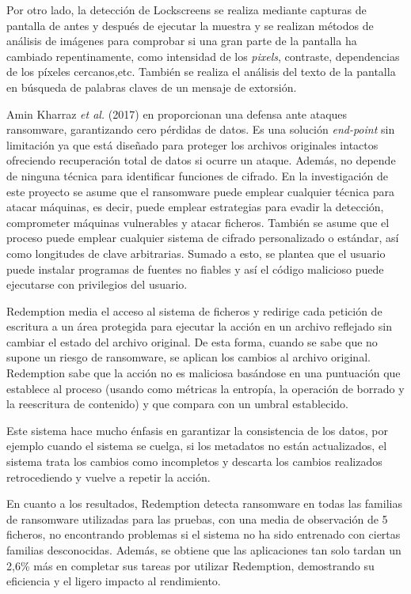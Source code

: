 Por otro lado, la detección de Lockscreens se realiza mediante capturas de pantalla de antes y después de ejecutar la muestra y se realizan métodos de análisis de imágenes para comprobar si una gran parte de la pantalla ha cambiado repentinamente, como intensidad de los \textit{pixels}, contraste, dependencias de los píxeles cercanos,etc. También se realiza el análisis del texto de la pantalla en búsqueda de palabras claves de un mensaje de extorsión.

Amin Kharraz \textit{et al.} (2017) en \cite{AminK2017} proporcionan una defensa ante ataques ransomware, garantizando cero pérdidas de datos. Es una solución \textit{end-point} sin limitación ya que está diseñado para proteger los archivos originales intactos ofreciendo recuperación total de datos si ocurre un ataque. Además, no depende de ninguna técnica para identificar funciones de cifrado.
En la investigación de este proyecto se asume que el ransomware puede emplear cualquier técnica para atacar máquinas, es decir, puede emplear estrategias para evadir la detección, comprometer máquinas vulnerables y atacar ficheros. También se asume que el proceso puede emplear cualquier sistema de cifrado personalizado o estándar, así como longitudes de clave arbitrarias. Sumado a esto, se plantea que el usuario puede instalar programas de fuentes no fiables y así el código malicioso puede ejecutarse con privilegios del usuario.

Redemption media el acceso al sistema de ficheros y redirige cada petición de escritura a un área protegida para ejecutar la acción en un archivo reflejado sin cambiar el estado del archivo original. De esta forma, cuando se sabe que no supone un riesgo de ransomware, se aplican los cambios al archivo original. Redemption sabe que la acción no es maliciosa basándose en una puntuación que establece al proceso (usando como métricas la entropía, la operación de borrado y la reescritura de contenido) y que compara con un umbral establecido.

Este sistema hace mucho énfasis en garantizar la consistencia de los datos, por ejemplo cuando el sistema se cuelga, si los metadatos no están actualizados, el sistema trata los cambios como incompletos y descarta los cambios realizados retrocediendo y vuelve a repetir la acción.

En cuanto a los resultados, Redemption detecta ransomware en todas las familias de ransomware utilizadas para las pruebas, con una media de observación de 5 ficheros, no encontrando problemas si el sistema no ha sido entrenado con ciertas familias desconocidas. Además, se obtiene que las aplicaciones tan solo tardan un 2,6\% más en completar sus tareas por utilizar Redemption, demostrando su eficiencia y el ligero impacto al rendimiento.

